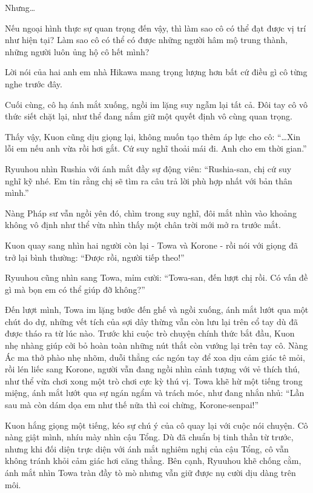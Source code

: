 \documentclass[../main.tex]{subfiles}
\begin{document}
Nhưng\dots

Nếu ngoại hình thực sự quan trọng đến vậy, thì làm sao cô có thể đạt được vị trí như hiện tại? Làm sao cô có thể có được những người hâm mộ trung thành, những người luôn ủng hộ cô hết mình?

Lời nói của hai anh em nhà Hikawa mang trọng lượng hơn bất cứ điều gì cô từng nghe trước đây.

Cuối cùng, cô hạ ánh mắt xuống, ngồi im lặng suy ngẫm lại tất cả. Đôi tay cô vô thức siết chặt lại, như thể đang nắm giữ một quyết định vô cùng quan trọng.

Thấy vậy, Kuon cũng dịu giọng lại, không muốn tạo thêm áp lực cho cô: ``\dots Xin lỗi em nếu anh vừa rồi hơi gắt. Cứ suy nghĩ thoải mái đi. Anh cho em thời gian.''

Ryuuhou nhìn Rushia với ánh mắt đầy sự động viên: ``Rushia-san, chị cứ suy nghĩ kỹ nhé. Em tin rằng chị sẽ tìm ra câu trả lời phù hợp nhất với bản thân mình.''

Nàng Pháp sư vẫn ngồi yên đó, chìm trong suy nghĩ, đôi mắt nhìn vào khoảng không vô định như thể vừa nhìn thấy một chân trời mới mở ra trước mắt.

Kuon quay sang nhìn hai người còn lại - Towa và Korone - rồi nói với giọng đã trở lại bình thường: ``Được rồi, người tiếp theo!''

Ryuuhou cũng nhìn sang Towa, mỉm cười: ``Towa-san, đến lượt chị rồi. Có vấn đề gì mà bọn em có thể giúp đỡ không?''

\ct

Đến lượt mình, Towa im lặng bước đến ghế và ngồi xuống, ánh mắt lướt qua một chút do dự, những vết tích của sợi dây thừng vẫn còn lưu lại trên cổ tay dù đã được tháo ra từ lúc nào. Trước khi cuộc trò chuyện chính thức bắt đầu, Kuon nhẹ nhàng giúp cởi bỏ hoàn toàn những nút thắt còn vướng lại trên tay cô. Nàng Ác ma thở phào nhẹ nhõm, duỗi thẳng các ngón tay để xoa dịu cảm giác tê mỏi, rồi lén liếc sang Korone, người vẫn đang ngồi nhìn cảnh tượng với vẻ thích thú, như thể vừa chơi xong một trò chơi cực kỳ thú vị. Towa khẽ hừ một tiếng trong miệng, ánh mắt lướt qua sự ngán ngẩm và trách móc, như đang nhắn nhủ: ``Lần sau mà còn dám dọa em như thế nữa thì coi chừng, Korone-senpai!''

Kuon hắng giọng một tiếng, kéo sự chú ý của cô quay lại với cuộc nói chuyện. Cô nàng giật mình, nhíu mày nhìn cậu Tổng. Dù đã chuẩn bị tinh thần từ trước, nhưng khi đối diện trực diện với ánh mắt nghiêm nghị của cậu Tổng, cô vẫn không tránh khỏi cảm giác hơi căng thẳng. Bên cạnh, Ryuuhou khẽ chống cằm, ánh mắt nhìn Towa tràn đầy tò mò nhưng vẫn giữ được nụ cười dịu dàng trên môi.
\end{document}
